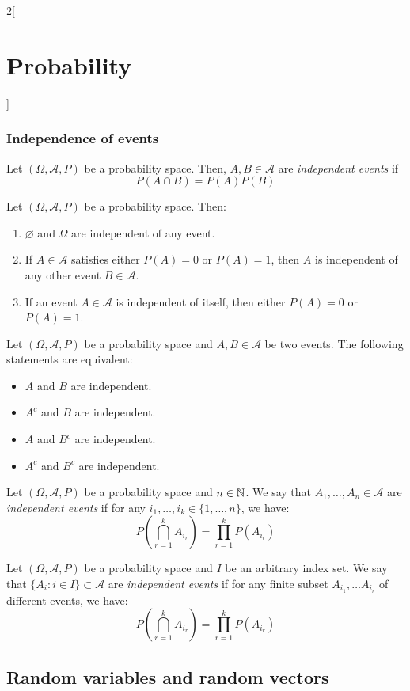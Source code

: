 \documentclass[../../../main.tex]{subfiles}
\begin{document}
\begin{multicols}{2}[\section{Probability}]
  \subsubsection*{Independence of events}
  \begin{definition}
    Let $(\Omega,\mathcal{A},P)$ be a probability space. Then, $A,B\in\mathcal{A}$ are \textit{independent events} if $$P(A\cap B)=P(A)P(B)$$
  \end{definition}
  \begin{prop}
    Let $(\Omega,\mathcal{A},P)$ be a probability space. Then:
    \begin{enumerate}
      \item $\varnothing$ and $\Omega$ are independent of any event.
      \item If $A\in\mathcal{A}$ satisfies either $P(A)=0$ or $P(A)=1$, then $A$ is independent of any other event $B\in\mathcal{A}$.
      \item If an event $A\in\mathcal{A}$ is independent of itself, then either $P(A)=0$ or $P(A)=1$.
    \end{enumerate}
  \end{prop}
  \begin{prop}
    Let $(\Omega,\mathcal{A},P)$ be a probability space and $A,B\in\mathcal{A}$ be two events. The following statements are equivalent:
    \begin{itemize}
      \item $A$ and $B$ are independent.
      \item $A^c$ and $B$ are independent.
      \item $A$ and $B^c$ are independent.
      \item $A^c$ and $B^c$ are independent.
    \end{itemize}
  \end{prop}
  \begin{definition}
    Let $(\Omega,\mathcal{A},P)$ be a probability space and $n\in\mathbb{N}$. We say that $A_1,\ldots,A_n\in\mathcal{A}$ are \textit{independent events} if for any $i_1,\ldots,i_k\in\{1,\ldots,n\}$, we have: $$P\left(\bigcap_{r=1}^kA_{i_r}\right)=\prod_{r=1}^kP(A_{i_r})$$
  \end{definition}
  \begin{definition}
    Let $(\Omega,\mathcal{A},P)$ be a probability space and $I$ be an arbitrary index set. We say that $\{A_i:i\in I\}\subset\mathcal{A}$ are \textit{independent events} if for any finite subset $A_{i_1},\ldots A_{i_r}$ of different events, we have: $$P\left(\bigcap_{r=1}^kA_{i_r}\right)=\prod_{r=1}^kP(A_{i_r})$$
  \end{definition}
  \subsection{Random variables and random vectors}
\end{multicols}
\end{document}
